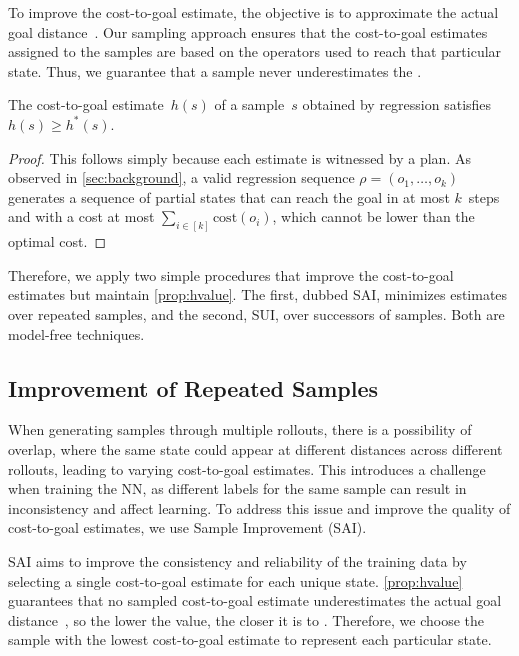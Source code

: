 To improve the cost-to-goal estimate, the objective is to approximate the actual goal distance~\hstar. Our sampling approach ensures that the cost-to-goal estimates assigned to the samples are based on the operators used to reach that particular state. Thus, we guarantee that a sample never underestimates the \hstar.

\begin{property}
    \label{prop:hvalue}
    The cost-to-goal estimate~$h(s)$ of a sample~$s$ obtained by regression satisfies $h(s)\geq h^*(s)$.
\end{property}
\begin{proof}
    This follows simply because each estimate is witnessed by a plan. As observed in \cref{sec:background}, a valid regression sequence $\rho=(o_1,\ldots,o_k)$ generates a sequence of partial states that can reach the goal in at most $k$~steps and with a cost at most $\sum_{i\in[k]}\text{cost}(o_i)$, which cannot be lower than the optimal cost.
\end{proof}

Therefore, we apply two simple procedures that improve the cost-to-goal estimates but maintain \cref{prop:hvalue}. The first, dubbed SAI, minimizes estimates over repeated samples, and the second, SUI, over successors of samples. Both are model-free techniques.

\subsection{Improvement of Repeated Samples}
\label{sec:sai}

When generating samples through multiple rollouts, there is a possibility of overlap, where the same state could appear at different distances across different rollouts, leading to varying cost-to-goal estimates. This introduces a challenge when training the NN, as different labels for the same sample can result in inconsistency and affect learning. To address this issue and improve the quality of cost-to-goal estimates, we use Sample Improvement (SAI).

SAI aims to improve the consistency and reliability of the training data by selecting a single cost-to-goal estimate for each unique state. \cref{prop:hvalue} guarantees that no sampled cost-to-goal estimate underestimates the actual goal distance~\hstar, so the lower the value, the closer it is to \hstar. Therefore, we choose the sample with the lowest cost-to-goal estimate to represent each particular state.

